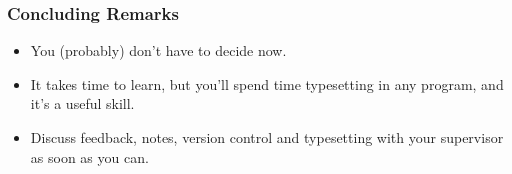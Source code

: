 \documentclass{beamer}
\begin{document}
\begin{frame} \frametitle{Concluding Remarks}
	\begin{itemize}
		\item You (probably) don't have to decide now.
		\item It takes time to learn, but you'll spend time typesetting in any program, and it's a useful skill.
		\item Discuss feedback, notes, version control and typesetting with your supervisor as soon as you can.
	\end{itemize}
\end{frame}

\begin{frame}
\doclicenseThis
\end{frame}
\end{document}
